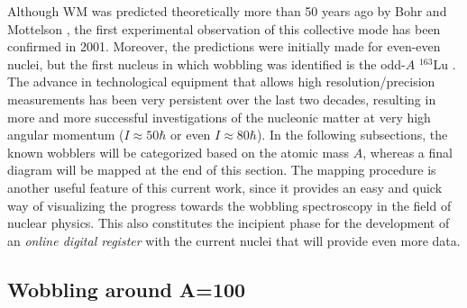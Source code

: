Although WM was predicted theoretically more than 50 years ago by Bohr and Mottelson \cite{bohr1998nuclear}, the first experimental observation of this collective mode has been confirmed in 2001. Moreover, the predictions were initially made for even-even nuclei, but the first nucleus in which wobbling was identified is the odd-$A$ $^{163}$Lu \cite{odegaard2001evidence}. The advance in technological equipment that allows high resolution/precision measurements has been very persistent over the last two decades, resulting in more and more successful investigations of the nucleonic matter at very high angular momentum ($I\approx 50\hbar$ or even $I\approx 80\hbar$). In the following subsections, the known wobblers will be categorized based on the atomic mass $A$, whereas a final diagram will be mapped at the end of this section. The mapping procedure is another useful feature of this current work, since it provides an easy and quick way of visualizing the progress towards the wobbling spectroscopy in the field of nuclear physics. This also constitutes the incipient phase for the development of an \emph{online digital register} with the current nuclei that will provide even more data.

\subsection{Wobbling around A=100}


